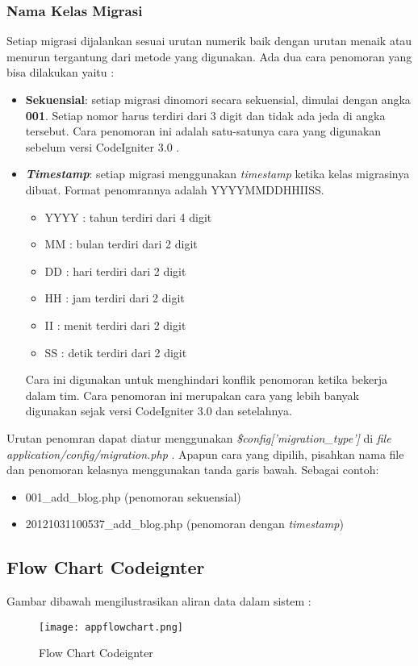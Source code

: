 \subsubsection{Nama Kelas Migrasi}
Setiap migrasi dijalankan sesuai urutan numerik baik dengan urutan menaik atau menurun tergantung dari metode yang digunakan. Ada dua cara penomoran yang bisa dilakukan yaitu :
\begin{itemize}
	\item \textbf{Sekuensial}: setiap migrasi dinomori secara sekuensial, dimulai dengan angka \textbf{001}. Setiap nomor harus terdiri dari 3 digit dan tidak ada jeda di angka tersebut. Cara penomoran ini adalah satu-satunya cara yang digunakan sebelum versi CodeIgniter 3.0 . \cite{CodeIgniter:17}
	\item \textbf{\textit{Timestamp}}: setiap migrasi menggunakan \textit{timestamp} ketika kelas migrasinya dibuat. Format penomrannya adalah YYYYMMDDHHIISS.
		\begin{itemize}
		\item YYYY	: tahun terdiri dari 4 digit
		\item MM	: bulan terdiri dari 2 digit
		\item DD	: hari terdiri dari 2 digit
		\item HH	: jam terdiri dari 2 digit
		\item II	: menit terdiri dari 2 digit
		\item SS	: detik terdiri dari 2 digit
		\end{itemize}
Cara ini digunakan untuk menghindari konflik penomoran ketika bekerja dalam tim. Cara penomoran ini merupakan cara yang lebih banyak digunakan sejak versi CodeIgniter 3.0 dan setelahnya. \cite{CodeIgniter:17}
\end{itemize}
Urutan penomran dapat diatur menggunakan \textit{\$config['migration\_type']} di \textit{file} \textit{application/config/migration.php} . Apapun cara yang dipilih, pisahkan nama file dan penomoran kelasnya menggunakan tanda garis bawah. Sebagai contoh: \cite{CodeIgniter:17}
\begin{itemize}
	\item 001\_add\_blog.php (penomoran sekuensial)
	\item 20121031100537\_add\_blog.php (penomoran dengan \textit{timestamp})
\end{itemize}

\subsection{Flow Chart Codeignter}
Gambar dibawah mengilustrasikan aliran data dalam sistem : 
\begin{figure} [H]
	\centering  
	\texttt{[image: appflowchart.png]}  
	\caption[Flow Chart Codeignter]{Flow Chart Codeignter} 
	\label{fig:flow-chart-CodeIgniter} 
\end{figure}

